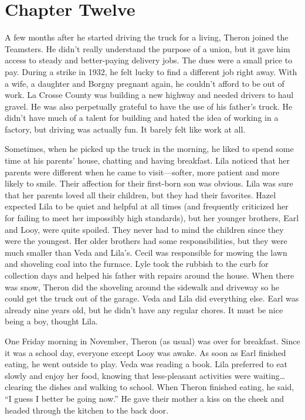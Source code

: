 \documentclass[
  letterpaper,
]{book}
\begin{document}
\chapter{Chapter Twelve}\label{chapter-twelve}

A few months after he started driving the truck for a living, Theron
joined the Teamsters. He didn't really understand the purpose of a
union, but it gave him access to steady and better-paying delivery jobs.
The dues were a small price to pay. During a strike in 1932, he felt
lucky to find a different job right away. With a wife, a daughter and
Borgny pregnant again, he couldn't afford to be out of work. La Crosse
County was building a new highway and needed drivers to haul gravel. He
was also perpetually grateful to have the use of his father's truck. He
didn't have much of a talent for building and hated the idea of working
in a factory, but driving was actually fun. It barely felt like work at
all.

Sometimes, when he picked up the truck in the morning, he liked to spend
some time at his parents' house, chatting and having breakfast. Lila
noticed that her parents were different when he came to visit---softer,
more patient and more likely to smile. Their affection for their
first-born son was obvious. Lila was sure that her parents loved all
their children, but they had their favorites. Hazel expected Lila to be
quiet and helpful at all times (and frequently criticized her for
failing to meet her impossibly high standards), but her younger
brothers, Earl and Looy, were quite spoiled. They never had to mind the
children since they were the youngest. Her older brothers had some
responsibilities, but they were much smaller than Veda and Lila's. Cecil
was responsible for mowing the lawn and shoveling coal into the furnace.
Lyle took the rubbish to the curb for collection days and helped his
father with repairs around the house. When there was snow, Theron did
the shoveling around the sidewalk and driveway so he could get the truck
out of the garage. Veda and Lila did everything else. Earl was already
nine years old, but he didn't have any regular chores. It must be nice
being a boy, thought Lila.

One Friday morning in November, Theron (as usual) was over for
breakfast. Since it was a school day, everyone except Looy was awake. As
soon as Earl finished eating, he went outside to play. Veda was reading
a book. Lila preferred to eat slowly and enjoy her food, knowing that
less-pleasant activities were waiting\ldots clearing the dishes and
walking to school. When Theron finished eating, he said, ``I guess I
better be going now.'' He gave their mother a kiss on the cheek and
headed through the kitchen to the back door.
\end{document}
